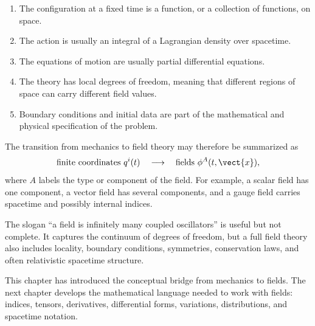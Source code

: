 \begin{enumerate}
    \item The configuration at a fixed time is a function, or a collection of
    functions, on space.
    \item The action is usually an integral of a Lagrangian density over
    spacetime.
    \item The equations of motion are usually partial differential equations.
    \item The theory has local degrees of freedom, meaning that different
    regions of space can carry different field values.
    \item Boundary conditions and initial data are part of the mathematical and
    physical specification of the problem.
\end{enumerate}

The transition from mechanics to field theory may therefore be summarized as
\[
    \text{finite coordinates } q^i(t)
    \quad \longrightarrow \quad
    \text{fields } \phi^A(t,\vect{x}),
\]
where \(A\) labels the type or component of the field. For example, a scalar
field has one component, a vector field has several components, and a gauge
field carries spacetime and possibly internal indices.

\begin{remarkbox}
The slogan ``a field is infinitely many coupled oscillators'' is useful but not
complete. It captures the continuum of degrees of freedom, but a full field
theory also includes locality, boundary conditions, symmetries, conservation
laws, and often relativistic spacetime structure.
\end{remarkbox}

This chapter has introduced the conceptual bridge from mechanics to fields. The
next chapter develops the mathematical language needed to work with fields:
indices, tensors, derivatives, differential forms, variations, distributions,
and spacetime notation.
